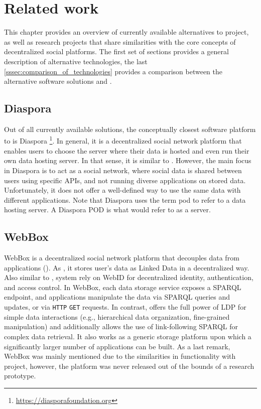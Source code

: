 \chapter{Related work}
\label{chap:num_2}

This chapter provides an overview of currently available alternatives to \solid{} project, as well as research projects that share similarities with the core concepts of decentralized social platforms. The first set of sections provides a general description of alternative technologies, the last \autoref{sssec:comparison_of_technologies} provides a comparison between the alternative software solutions and \solid{}.

\section{Diaspora}

Out of all currently available solutions, the conceptually closest software platform to \solid{} is Diaspora \footnote{\url{https://diasporafoundation.org}}. In general, it is a decentralized social network platform that enables users to choose the server where their data is hosted and even run their own data hosting server. In that sense, it is similar to \solid{}. However, the main focus in Diaspora is to act as a social network, where social data is shared between users using specific APIs, and not running diverse applications on stored data. Unfortunately, it does not offer a well-defined way to use the same data with different applications. Note that Diaspora uses the term pod to refer to a data hosting server. A Diaspora POD is what \solid{} would refer to as a \solid{} server.

\section{WebBox}

WebBox is a decentralized social network platform that decouples data from applications (\cite{van2012decentralized}). As \solid{}, it stores user’s data as Linked Data in a decentralized way. Also similar to \solid{}, system rely on WebID for decentralized identity, authentication, and access control. In WebBox, each data storage service exposes a SPARQL endpoint, and applications manipulate the data via SPARQL queries and updates, or via \texttt{HTTP} \texttt{GET} requests. In contrast, \solid{} offers the full power of LDP for simple data interactions (e.g., hierarchical data organization, fine-grained manipulation) and additionally allows the use of link-following SPARQL for complex data retrieval. It also works as a generic storage platform upon which a significantly larger number of applications can be built. As a last remark, WebBox was mainly mentioned due to the similarities in functionality with \solid{} project, however, the platform was never released out of the bounds of a research prototype.

